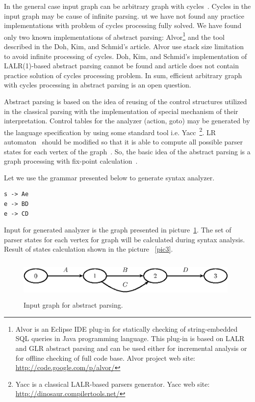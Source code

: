 \documentclass{llncs}
\begin{document}
In the general case input graph can be arbitrary graph with cycles~\cite{AbstrParsing}. Cycles in the input graph may 
be cause of infinite parsing. ut we have not found any practice implementations with problem of cycles processing fully 
solved. We have found only two known implementations of abstract parsing: Alvor\footnote{Alvor is an Eclipse IDE plug-in 
for statically checking of string-embedded SQL queries in Java programming language. This plug-in is based on LALR and GLR 
abstract parsing and can be used either for incremental analysis or for offline checking of full code base. Alvor project 
web site: \href{http://code.google.com/p/alvor/}{http://code.google.com/p/alvor/}} and the tool described in the Doh, Kim, 
and Schmid's article. Alvor use stack size limitation to avoid infinite processing of cycles. Doh, Kim, and Schmid's 
implementation of LALR(1)-based abstract parsing cannot be found and article does not contain practice solution of 
cycles processing problem. In sum, efficient arbitrary graph with cycles processing in abstract parsing is an open question.
	
Abstract parsing is based on the idea of reusing of the control structures utilized in the classical parsing with the 
implementation of special mechanism of their interpretation. Control tables for the analyzer (action, goto) may be generated by
 the language specification by using some standard tool i.e. Yacc~\footnote{Yacc is a classical LALR-based parsers generator. 
Yacc web site: \href{http://dinosaur.compilertools.net/}{http://dinosaur.compilertools.net/}}. LR automaton~\cite{Grune} should
 be modified so that it is able to compute all possible parser states for each vertex of the graph~\cite{AbstrParsing}. 
So, the basic idea of the abstract parsing is a graph processing with fix-point calculation~\cite{ALVOR2}.

Let we use the grammar presented below to generate syntax analyzer.

\begin{verbatim}
s -> Ae
e -> BD
e -> CD
\end{verbatim}

Input for generated analyzer is the graph presented in picture~\ref{pic2}. The set of parser states for each vertex for 
graph will be calculated during syntax analysis. Result of states calculation shown in the picture ~\ref{pic3}.

\begin{figure}
    \begin{center}
        \includegraphics[width=11cm,height=2cm]{graphs/simple_grammar_inpt.eps}
        \caption{Input graph for abstract parsing.}
        \label{pic2}
    \end{center}
\end{figure}
\end{document}
